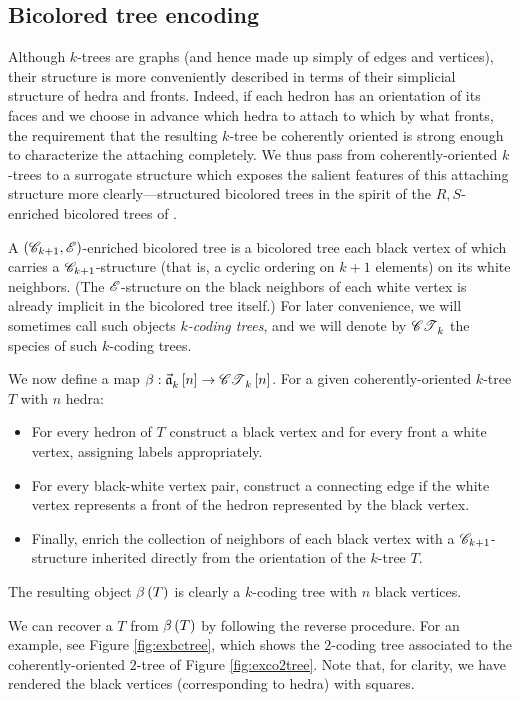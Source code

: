 \documentclass[distribution,draft]{brandiss} %
\numberwithin{section}{chapter}
\numberwithin{figure}{chapter}
\begin{document}
\subsection{Bicolored tree encoding}\label{ss:bctree}
Although $k$-trees are graphs (and hence made up simply of edges and vertices), their structure is more conveniently described in terms of their simplicial structure of hedra and fronts.
Indeed, if each hedron has an orientation of its faces and we choose in advance which hedra to attach to which by what fronts, the requirement that the resulting $k$-tree be coherently oriented is strong enough to characterize the attaching completely.
We thus pass from coherently-oriented $k$-trees to a surrogate structure which exposes the salient features of this attaching structure more clearly---structured bicolored trees in the spirit of the $R, S$-enriched bicolored trees of \cite[\S 3.2]{bll:species}.

A $\left( {\mathscr{C}_{k+1}, \mathscr{E}} \right)$-enriched bicolored tree is a bicolored tree each black vertex of which carries a $\mathscr{C}_{k+1}$-structure (that is, a cyclic ordering on $k+1$ elements) on its white neighbors.
(The $\mathscr{E}$-structure on the black neighbors of each white vertex is already implicit in the bicolored tree itself.)
For later convenience, we will sometimes call such objects \emph{$k$-coding trees}, and we will denote by $\mathscr{CT}_{k}^{}$ the species of such $k$-coding trees.

We now define a map $\beta: \vec{\mathfrak{a}}_{k}^{} \left[ {n} \right] \to \mathscr{CT}_{k}^{} \left[ {n} \right]$.
For a given coherently-oriented $k$-tree $T$ with $n$ hedra:
\begin{itemize}
  \item For every hedron of $T$ construct a black vertex and for every front a white vertex, assigning labels appropriately.
  \item For every black-white vertex pair, construct a connecting edge if the white vertex represents a front of the hedron represented by the black vertex.
  \item Finally, enrich the collection of neighbors of each black vertex with a $\mathscr{C}_{k+1}$-structure inherited directly from the orientation of the $k$-tree $T$.
\end{itemize}
The resulting object $\beta \left( {T} \right)$ is clearly a $k$-coding tree with $n$ black vertices.

We can recover a $T$ from $\beta \left( {T} \right)$ by following the reverse procedure.
For an example, see Figure \ref{fig:exbctree}, which shows the $2$-coding tree associated to the coherently-oriented $2$-tree of Figure \ref{fig:exco2tree}.
Note that, for clarity, we have rendered the black vertices (corresponding to hedra) with squares.
\end{document}

